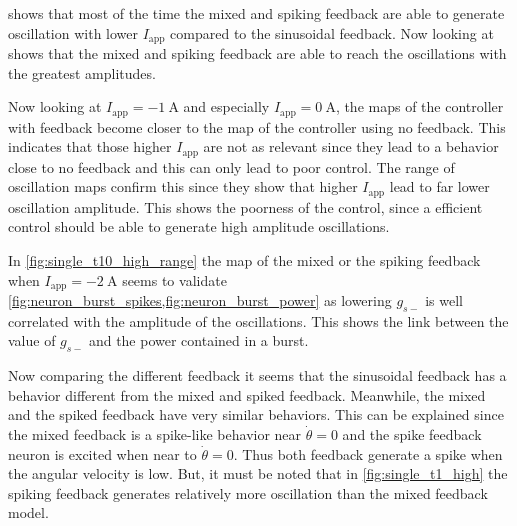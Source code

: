 
 shows that most of the time the mixed and spiking feedback are able to generate oscillation with lower $I_\text{app}$ compared to the sinusoidal feedback. Now looking at  shows that the mixed and spiking feedback are able to reach the oscillations with the greatest amplitudes. 

Now looking at $I_\text{app} = \qty{-1}{\ampere}$ and especially $I_\text{app} = \qty{0}{\ampere}$, the maps of the controller with feedback become closer to the map of the controller using no feedback. This indicates that those higher $I_\text{app}$ are not as relevant since they lead to a behavior close to no feedback and this can only lead to poor control. The range of oscillation maps confirm this since they show that higher $I_\text{app}$ lead to far lower oscillation amplitude. This shows the poorness of the control, since a efficient control should be able to generate high amplitude oscillations.

In \cref{fig:single_t10_high_range} the  map of the mixed or the spiking feedback when $I_\text{app}=\qty{-2}{\ampere}$ seems to validate \cref{fig:neuron_burst_spikes,fig:neuron_burst_power} as lowering $g_{s-}$ is well correlated with the amplitude of the oscillations. This shows the link between the value of $g_{s-}$ and the power contained in a burst.

Now comparing the different feedback it seems that the sinusoidal feedback has a behavior different from the mixed and spiked feedback. Meanwhile, the mixed and the spiked feedback have very similar behaviors. This can be explained since the mixed feedback is a spike-like behavior near $\dot{\theta}=0$ and the spike feedback neuron is excited when near to $\dot{\theta}=0$. Thus both feedback generate a spike when the angular velocity is low. But, it must be noted that in \cref{fig:single_t1_high} the spiking feedback generates relatively more oscillation than the mixed feedback model.

